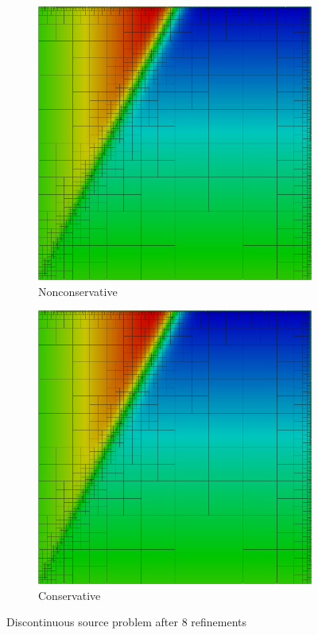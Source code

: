\documentclass[Proposal.tex]{subfiles}
\begin{document}
\begin{figure}[p]
\centering
\begin{subfigure}[t]{0.45\textwidth}
\centering
\includegraphics[width=\textwidth]{figs/Discontinuous/modified8nc.png}
\caption{Nonconservative}
\label{fig:discontinuousModified8nc}
\end{subfigure}
\begin{subfigure}[t]{0.45\textwidth}
\centering
\includegraphics[width=\textwidth]{figs/Discontinuous/modified8c.png}
\caption{Conservative}
\label{fig:discontinuousModified8c}
\end{subfigure}
\caption{Discontinuous source problem after 8 refinements}
\label{fig:discontinuous}
\end{figure}
\end{document}
